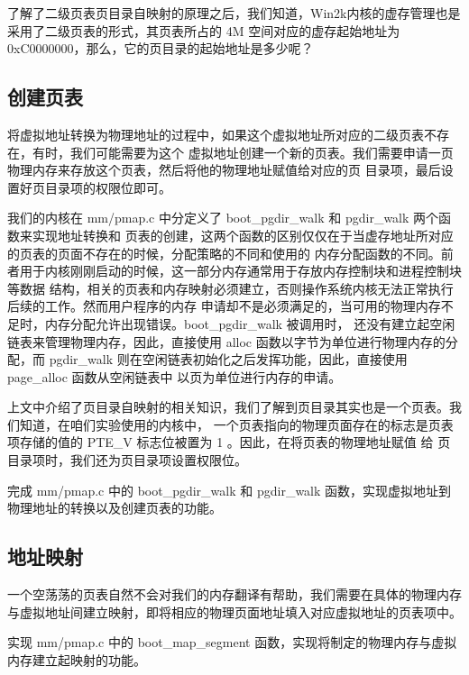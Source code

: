 \begin{thinking}\label{think-windows_pde_addr}
了解了二级页表页目录自映射的原理之后，我们知道，Win2k内核的虚存管理也是采用了二级页表的形式，其页表所占的 4M
空间对应的虚存起始地址为 0xC0000000，那么，它的页目录的起始地址是多少呢？
\end{thinking}

\subsection{创建页表}

将虚拟地址转换为物理地址的过程中，如果这个虚拟地址所对应的二级页表不存在，有时，我们可能需要为这个
虚拟地址创建一个新的页表。我们需要申请一页物理内存来存放这个页表，然后将他的物理地址赋值给对应的页
目录项，最后设置好页目录项的权限位即可。

我们的内核在 mm/pmap.c 中分定义了 boot\_pgdir\_walk 和 pgdir\_walk 两个函数来实现地址转换和
页表的创建，这两个函数的区别仅仅在于当虚存地址所对应的页表的页面不存在的时候，分配策略的不同和使用的
内存分配函数的不同。前者用于内核刚刚启动的时候，这一部分内存通常用于存放内存控制块和进程控制块等数据
结构，相关的页表和内存映射必须建立，否则操作系统内核无法正常执行后续的工作。然而用户程序的内存
申请却不是必须满足的，当可用的物理内存不足时，内存分配允许出现错误。boot\_pgdir\_walk 被调用时，
还没有建立起空闲链表来管理物理内存，因此，直接使用 alloc 函数以字节为单位进行物理内存的分配，而
 pgdir\_walk 则在空闲链表初始化之后发挥功能，因此，直接使用 page\_alloc 函数从空闲链表中
以页为单位进行内存的申请。

上文中介绍了页目录自映射的相关知识，我们了解到页目录其实也是一个页表。我们知道，在咱们实验使用的内核中，
一个页表指向的物理页面存在的标志是页表项存储的值的 PTE\_V 标志位被置为 1 。因此，在将页表的物理地址赋值
给 页目录项时，我们还为页目录项设置权限位。

\begin{exercise}
完成 mm/pmap.c 中的 boot\_pgdir\_walk 和 pgdir\_walk 函数，实现虚拟地址到物理地址的转换以及创建页表的功能。
\end{exercise}

\subsection{地址映射}
一个空荡荡的页表自然不会对我们的内存翻译有帮助，我们需要在具体的物理内存与虚拟地址间建立映射，即将相应的物理页面地址填入对应虚拟地址的页表项中。
\begin{exercise}
实现 mm/pmap.c 中的 boot\_map\_segment 函数，实现将制定的物理内存与虚拟内存建立起映射的功能。
\end{exercise}

